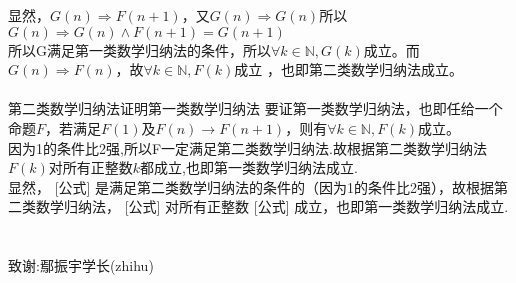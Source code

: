 \documentclass[a4paper, justified]{tufte-handout}
\begin{document}
显然，$G(n)\Rightarrow F(n + 1)$，又$G(n)\Rightarrow G(n)$所以$G(n)\Rightarrow G(n)\wedge F(n + 1) = G(n+1)$\\
所以G满足第一类数学归纳法的条件，所以$\forall k \in \mathbb{N} , G(k)$成立。而$G(n)\Rightarrow F(n)$，故$\forall k \in \mathbb{N} , F(k)$成立 ，也即第二类数学归纳法成立。\\
\\
第二类数学归纳法证明第一类数学归纳法
要证第一类数学归纳法，也即任给一个命题$F$，若满足$F(1)$及$F(n)\rightarrow F(n + 1)$，则有$\forall k \in \mathbb{N} , F(k)$成立。\\
因为1的条件比2强,所以F一定满足第二类数学归纳法.故根据第二类数学归纳法$F(k)$对所有正整数$k$都成立,也即第一类数学归纳法成立.\\

显然， [公式] 是满足第二类数学归纳法的条件的（因为1的条件比2强），故根据第二类数学归纳法， [公式] 对所有正整数 [公式] 成立，也即第一类数学归纳法成立.\\
\\
\\
致谢:鄢振宇学长(zhihu)

\beginfb

\end{document}
